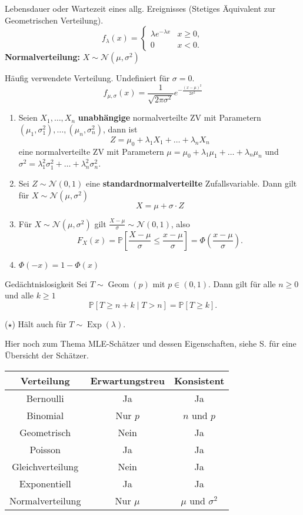 Lebensdauer oder Wartezeit eines allg. Ereignisses (Stetiges Äquivalent zur Geometrischen Verteilung).
$$f_\lambda(x) = \begin{cases}
    \lambda e^{-\lambda x} & x \ge 0,\\
    0 & x < 0.
\end{cases}$$ 
\textbf{Normalverteilung:} $X \sim \mathcal{N}(\mu, \sigma^2)$

Häufig verwendete Verteilung. Undefiniert für $\sigma = 0$.
$$f_{\mu, \sigma}(x) = \frac{1}{\sqrt{2\pi\sigma^2}}e^{-\frac{(x-\mu)^2}{2\sigma^2}}$$
\begin{enumerate}
    \item Seien $X_1, \ldots, X_n$ \textbf{unabhängige} normalverteilte ZV mit Parametern $(\mu_1,\sigma_1^2), \ldots, (\mu_n, \sigma_n^2)$, dann ist 
    $$Z = \mu_0 + \lambda_1 X_1 + \ldots + \lambda_n X_n$$
    eine normalverteilte ZV mit Parametern $\mu = \mu_0 + \lambda_1 \mu_1 + \ldots + \lambda_n \mu_n$ und $\sigma^2 = \lambda_1^2 \sigma_1^2 + \ldots + \lambda_n^2 \sigma_n^2$.
    \item Sei $Z \sim \mathcal{N}(0,1)$ eine \textbf{standardnormalverteilte} Zufallsvariable. Dann gilt für $X \sim \mathcal{N}(\mu, \sigma^2)$ 
    $$X = \mu + \sigma \cdot Z$$   
    \item Für $X \sim \mathcal{N}\left(\mu, \sigma^2\right)$ gilt $\frac{X-\mu}{\sigma} \sim \mathcal{N}(0,1)$, also
$$
F_X(x)=\mathbb{P}\left[\frac{X-\mu}{\sigma} \leq \frac{x-\mu}{\sigma}\right]=\Phi\left(\frac{x-\mu}{\sigma}\right) .
$$

\item $\Phi(-x) = 1 - \Phi(x)$
\end{enumerate}


\begin{mainbox}{Gedächtnislosigkeit}
Sei $T \sim \operatorname{Geom}(p)$ mit $p \in(0,1)$. Dann gilt für alle $n \geq 0$ und alle $k \geq 1$
$$
\mathbb{P}[T \geq n+k \mid T>n]=\mathbb{P}[T \geq k] .
$$

($\star$) Hält auch für $T\sim \operatorname{Exp}(\lambda)$.
\end{mainbox}

Hier noch zum Thema MLE-Schätzer und dessen Eigenschaften, siehe S. \pageref{sec:mle-schaetzer} für eine Übersicht der Schätzer.
\begin{table}[h!]
\centering
\begin{tabular}{|c|c|c|}
\hline
Verteilung & Erwartungstreu & Konsistent \\
\hline
\hline
Bernoulli & Ja & Ja \\
\hline
Binomial & Nur $p$ & $n$ und $p$ \\
\hline
Geometrisch & Nein & Ja \\
\hline
Poisson & Ja & Ja \\
\hline
Gleichverteilung & Nein & Ja \\
\hline
Exponentiell & Ja & Ja \\
\hline
Normalverteilung & Nur $\mu$ & $\mu$ und $\sigma^2$ \\
\hline
\end{tabular}
\end{table}
